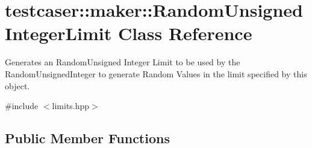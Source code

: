 \hypertarget{classtestcaser_1_1maker_1_1RandomUnsignedIntegerLimit}{}\section{testcaser\+:\+:maker\+:\+:Random\+Unsigned\+Integer\+Limit Class Reference}
\label{classtestcaser_1_1maker_1_1RandomUnsignedIntegerLimit}


Generates an Random\+Unsigned Integer Limit to be used by the Random\+Unsigned\+Integer to generate Random Values in the limit specified by this object.  




{\ttfamily \#include $<$limits.\+hpp$>$}

\subsection*{Public Member Functions}
